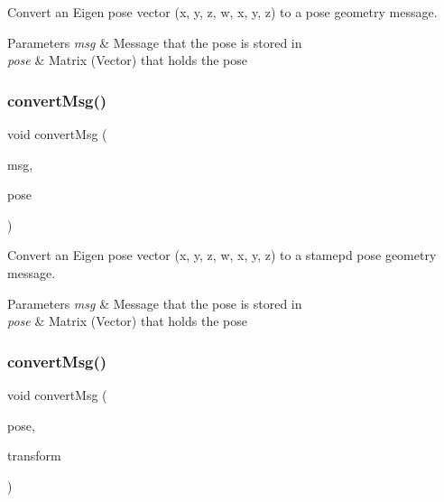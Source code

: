 Convert an Eigen pose vector (x, y, z, w, x, y, z) to a pose geometry message. 


\begin{DoxyParams}{Parameters}
{\em msg} & Message that the pose is stored in \\
\hline
{\em pose} & Matrix (Vector) that holds the pose \\
\hline
\end{DoxyParams}
\mbox{\label{group__multi__robot__controller_gaf1628de186f2d90b064f8c8b36beef53}} 
\subsubsection{\texorpdfstring{convert\+Msg()}{convertMsg()}\hspace{0.1cm}{\footnotesize\ttfamily [9/14]}}
{\footnotesize\ttfamily void convert\+Msg (\begin{DoxyParamCaption}\item[{geometry\+\_\+msgs\+::\+Pose\+Stamped \&}]{msg,  }\item[{Eigen\+::\+Matrix$<$ double, 7, 1 $>$ \&}]{pose }\end{DoxyParamCaption})\hspace{0.3cm}{\ttfamily [inline]}}



Convert an Eigen pose vector (x, y, z, w, x, y, z) to a stamepd pose geometry message. 


\begin{DoxyParams}{Parameters}
{\em msg} & Message that the pose is stored in \\
\hline
{\em pose} & Matrix (Vector) that holds the pose \\
\hline
\end{DoxyParams}
\mbox{\label{group__multi__robot__controller_ga45b2bbef58d2c60ff8eeb77d221f2ab7}} 
\subsubsection{\texorpdfstring{convert\+Msg()}{convertMsg()}\hspace{0.1cm}{\footnotesize\ttfamily [10/14]}}
{\footnotesize\ttfamily void convert\+Msg (\begin{DoxyParamCaption}\item[{geometry\+\_\+msgs\+::\+Pose \&}]{pose,  }\item[{geometry\+\_\+msgs\+::\+Transform \&}]{transform }\end{DoxyParamCaption})\hspace{0.3cm}{\ttfamily [inline]}}



